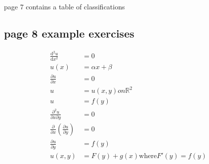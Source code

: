 \documentclass{article}
\begin{document}
page 7 contains a table of classifications

\subsection*{page 8 example exercises}
\begin{align*}
  \frac{\mathrm{d}^2u}{\mathrm{d}x^2}&=0\\
  u(x)&=\alpha x+\beta\\
  \frac{\partial u}{\partial x}&=0\\
  u&=u(x,y) on \mathbb{R}^2\\
  u&=f(y)\\
  \frac{\partial^2 u}{\partial x\partial y}&=0\\
  \frac{\partial }{\partial x}\left(\frac{\partial u}{\partial y}\right)&=0\\
  \frac{\partial u}{\partial y}&=f(y)\\
  u(x,y)&=F(y)+g(x) \text{where} F'(y)=f(y)
\end{align*}
\end{document}
